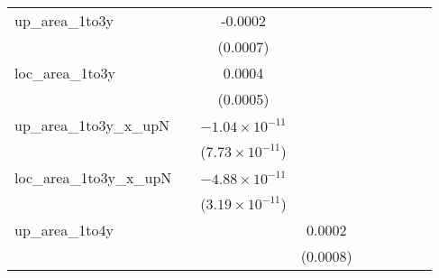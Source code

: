 \begin{tabular}{lcccccccc}
   up\_area\_1to3y              &                          & -0.0002                  &                          &                          &                               &                          &                          &   \\   
                                &                          & (0.0007)                 &                          &                          &                               &                          &                          &   \\   
   loc\_area\_1to3y             &                          & 0.0004                   &                          &                          &                               &                          &                          &   \\   
                                &                          & (0.0005)                 &                          &                          &                               &                          &                          &   \\   
   up\_area\_1to3y\_x\_upN      &                          & $-1.04\times 10^{-11}$   &                          &                          &                               &                          &                          &   \\   
                                &                          & ($7.73\times 10^{-11}$)  &                          &                          &                               &                          &                          &   \\   
   loc\_area\_1to3y\_x\_upN     &                          & $-4.88\times 10^{-11}$   &                          &                          &                               &                          &                          &   \\   
                                &                          & ($3.19\times 10^{-11}$)  &                          &                          &                               &                          &                          &   \\   
   up\_area\_1to4y              &                          &                          & 0.0002                   &                          &                               &                          &                          &   \\   
                                &                          &                          & (0.0008)                 &                          &                               &                          &                          &   \\   

\end{tabular}
